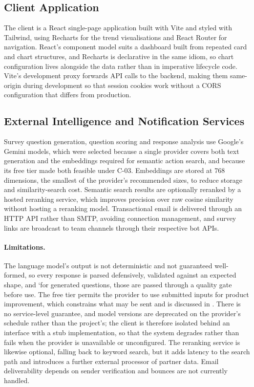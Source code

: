 \subsection{Client Application}
\label{subsec:tool-client}

The client is a React single-page application built with Vite and styled with
Tailwind, using Recharts for the trend visualisations and React Router for
navigation. React's component model suits a dashboard built from repeated card
and chart structures, and Recharts is declarative in the same idiom, so chart
configuration lives alongside the data rather than in imperative lifecycle code.
Vite's development proxy forwards API calls to the backend, making them
same-origin during development so that session cookies work without a CORS
configuration that differs from production.


\subsection{External Intelligence and Notification Services}
\label{subsec:tool-external}

Survey question generation, question scoring and response analysis use Google's
Gemini models, which were selected because a single provider covers both text
generation and the embeddings required for semantic action search, and because
its free tier made both feasible under C-03. Embeddings are stored at 768
dimensions, the smallest of the provider's recommended sizes, to reduce
storage and similarity-search cost. Semantic search results are optionally
reranked by a hosted reranking service, which improves precision over raw cosine
similarity without hosting a reranking model. Transactional email is delivered
through an HTTP API rather than SMTP, avoiding connection management, and survey
links are broadcast to team channels through their respective bot APIs.

\paragraph{Limitations.}
The language model's output is not deterministic and not guaranteed
well-formed, so every response is parsed defensively, validated against an
expected shape, and `for generated questions, those are passed through a quality gate
before use. The free tier permits the provider to use submitted inputs for
product improvement, which constrains what may be sent and is discussed in
. There is no service-level guarantee, and model versions are
deprecated on the provider's schedule rather than the project's; the client is
therefore isolated behind an interface with a stub implementation, so that the
system degrades rather than fails when the provider is unavailable or
unconfigured. The reranking service is likewise optional, falling back to
keyword search, but it adds latency to the search path and introduces a further
external processor of partner data. Email deliverability depends on sender
verification and bounces are not currently handled.


